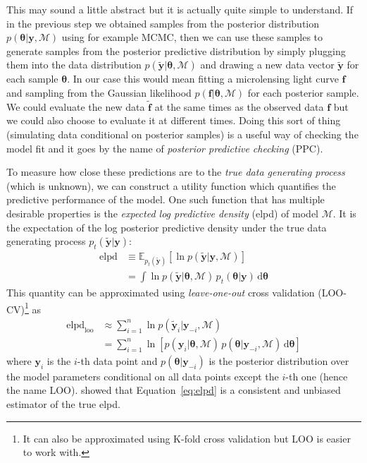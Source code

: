 \documentclass[12pt,dvipsnames]{report}
\newcommand{\ud}{\,\mathrm{d}}
\renewcommand{\vec}[1]{\boldsymbol{\mathbf{#1}}}
\begin{document}
This may sound a little abstract but it is actually quite simple to understand.
If in the previous step we obtained samples from the posterior distribution 
$p(\vec \theta \vert \vec y,\mathcal{M})$ using for example MCMC, then we can use 
these samples to generate samples from the posterior predictive distribution by 
simply  plugging them into the data distribution $p(\tilde{\vec y}|\vec \theta,\mathcal{M})$
and drawing a new data vector $\tilde{\vec y}$ for each sample $\vec \theta$. 
In our case this would mean fitting a microlensing light curve $\vec f$ and sampling
from the Gaussian likelihood $p(\vec f|\vec \theta,\mathcal{M})$ for each posterior 
sample. We could evaluate the new data $\tilde{\vec f}$ at the same times as the 
observed data $\vec f$ but we could also choose to evaluate it at different times.
Doing this sort of thing (simulating data conditional on posterior samples) is a useful
way of checking the model fit and it goes by the name of \emph{posterior predictive
checking} (PPC).

To measure how close these predictions are to the \emph{true data generating process} 
(which is unknown), we can construct a utility function which quantifies the 
predictive performance of the model. One such function that has multiple desirable
properties is the \emph{expected log predictive density} (elpd) of model $\mathcal{M}$.
It is the expectation of the log posterior predictive density under the true data 
generating process $p_t(\tilde{\vec y}|\vec y)$:
\begin{align}
    \mathrm{elpd}&\equiv\mathbb{E}_{p_t(\tilde{\vec y})}\left[ \ln p(\tilde{\vec y}|\vec y,\mathcal{M})\right]\\
    &= \int \ln p(\tilde{\vec y}|\vec \theta,\mathcal{M})\,p_t(\vec \theta|\vec y)\ud\vec \theta
    \label{eq:elpd}
\end{align}
This quantity can be approximated using \emph{leave-one-out} cross validation (LOO-CV)\footnote{
    It can also be approximated using K-fold cross validation but LOO is easier to work with.
}
as \citep{vehtari2017}
\begin{align}
\mathrm{elpd}_\mathrm{loo}&\approx \sum_{i=1}^n \ln p(\tilde{\vec y}_i|\vec y_{-i},\mathcal{M})\\
&=\sum_{i=1}^n\ln\left[p(\vec y_i|\vec \theta,\mathcal{M})\,p(\vec \theta | \vec y_{-i},\mathcal{M})\ud\vec\theta\right]
\label{eq:elpd_loo}
\end{align}
where $\vec y_i$ is the $i$-th data point and $p(\vec \theta|\vec y_{-i})$ is the 
posterior distribution over the model parameters conditional on all data points except 
the $i$-th one (hence the name LOO). 
\citet{arXiv:1004.2316} showed that Equation~\ref{eq:elpd} is a consistent and unbiased 
estimator of the true elpd.
\end{document}

